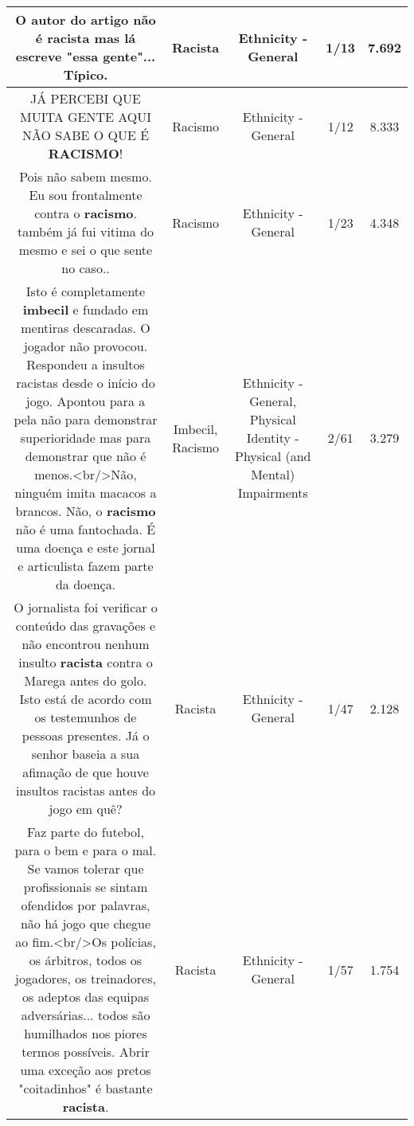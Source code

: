 \documentclass[11pt]{article}
\newlength\mylength
\begin{document}
\begin{center}
\begin{longtable}{|C{.65\mylength}|C{.30\mylength}|C{.12\mylength}|C{.12\mylength}|C{.12\mylength}|}
  \small O autor do artigo não é \textbf{racista} mas lá escreve "essa gente"... Típico.\normalsize   & Racista & Ethnicity - General & 1/13 & 7.692 \\  \hline
  \small JÁ PERCEBI QUE MUITA GENTE AQUI NÃO SABE O QUE É \textbf{RACISMO}!\normalsize   & Racismo & Ethnicity - General & 1/12 & 8.333 \\  \hline
  \small Pois não sabem mesmo. Eu sou frontalmente contra o \textbf{racismo}. também já fui vitima do mesmo e sei o que sente no caso..\normalsize   & Racismo & Ethnicity - General & 1/23 & 4.348 \\  \hline
  \small Isto é completamente \textbf{imbecil} e fundado em mentiras descaradas. O jogador não provocou. Respondeu a insultos racistas desde o início do jogo. Apontou para a pela não para demonstrar superioridade mas para demonstrar que não é menos.<br/>Não, ninguém imita macacos a brancos. Não, o \textbf{racismo} não é uma fantochada. É uma doença e este jornal e articulista fazem parte da doença.\normalsize   & Imbecil, Racismo & Ethnicity - General, Physical Identity - Physical (and Mental) Impairments & 2/61 & 3.279 \\  \hline
  \small O jornalista foi verificar o conteúdo das gravações e não encontrou nenhum insulto \textbf{racista} contra o Marega antes do golo. Isto está de acordo com os testemunhos de pessoas presentes. Já o senhor baseia a sua afimação de que houve insultos racistas antes do jogo em quê?\normalsize   & Racista & Ethnicity - General & 1/47 & 2.128 \\  \hline
  \small Faz parte do futebol, para o bem e para o mal. Se vamos tolerar que profissionais se sintam ofendidos por palavras, não há jogo que chegue ao fim.<br/>Os polícias, os árbitros, todos os jogadores, os treinadores, os adeptos das equipas adversárias... todos são humilhados nos piores termos possíveis. Abrir uma exceção aos pretos "coitadinhos" é bastante \textbf{racista}.\normalsize   & Racista & Ethnicity - General & 1/57 & 1.754 \\  \hline

\end{longtable}
\end{center}
\end{document}
